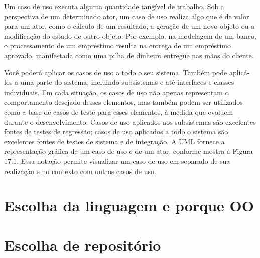 \documentclass[12pt,a4paper]{article}
\begin{document}
Um caso de uso executa alguma quantidade tangível de trabalho. Sob a
perspectiva de um determinado ator, um caso de uso realiza algo que é de valor
para um ator, como o cálculo de um resultado, a geração de um novo objeto ou
a modificação do estado de outro objeto. Por exemplo, na modelagem de um
banco, o processamento de um empréstimo resulta na entrega de um empréstimo aprovado, manifestada como uma pilha de dinheiro entregue nas mãos do
cliente.

Você poderá aplicar os casos de uso a todo o seu sistema. Também pode
aplicá-los a uma parte do sistema, incluindo subsistemas e até interfaces e classes
individuais. Em cada situação, os casos de uso não apenas representam o comportamento desejado desses elementos, mas também podem ser utilizados como
a base de casos de teste para esses elementos, à medida que evoluem durante o
desenvolvimento. Casos de uso aplicados aos subsistemas são excelentes fontes
de testes de regressão; casos de uso aplicados a todo o sistema são excelentes
fontes de testes de sistema e de integração. A UML fornece a representação gráfica de um caso de uso e de um ator, conforme mostra a Figura 17.1. Essa notação permite visualizar um caso de uso em separado de sua realização e no contexto com outros casos de uso.
\section{Escolha da linguagem e porque OO}
\section{Escolha de repositório}
\subsection{}

\newpage

\printbibliography
\end{document}
